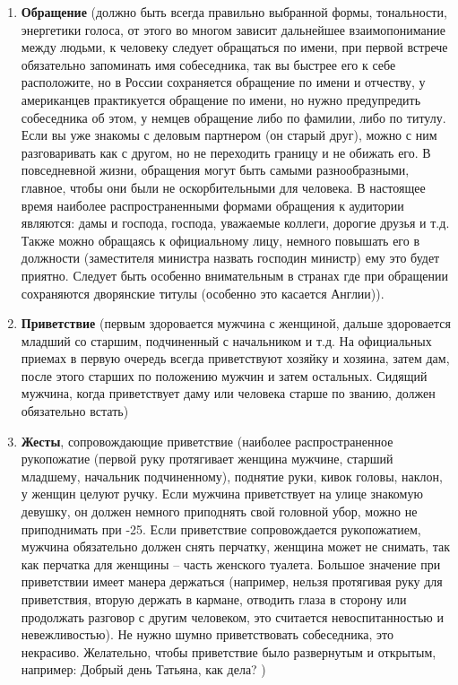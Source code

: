\documentclass{article}
\begin{document}
\begin{enumerate}
    \item \textbf{Обращение} (должно быть всегда правильно выбранной формы, тональности, энергетики голоса, от этого во многом зависит дальнейшее взаимопонимание между людьми, к человеку следует обращаться по имени, при первой встрече обязательно запоминать имя собеседника, так вы быстрее его к себе расположите, но в России сохраняется обращение по имени и отчеству, у американцев практикуется обращение по имени, но нужно предупредить собеседника об этом, у немцев обращение либо по фамилии, либо по титулу. Если вы уже знакомы с деловым партнером (он старый друг), можно с ним разговаривать как с другом, но не переходить границу и не обижать его. В повседневной жизни, обращения могут быть самыми разнообразными, главное, чтобы они были не оскорбительными для человека. В настоящее время наиболее распространенными формами обращения к аудитории являются: дамы и господа, господа, уважаемые коллеги, дорогие друзья и т.д. Также можно обращаясь к официальному лицу, немного повышать его в должности (заместителя министра назвать господин министр) ему это будет приятно. Следует быть особенно внимательным в странах где при обращении сохраняются дворянские титулы (особенно это касается Англии)).
    \item \textbf{Приветствие} (первым здоровается мужчина с женщиной, дальше здоровается младший со старшим, подчиненный с начальником и т.д. На официальных приемах в первую очередь всегда приветствуют хозяйку и хозяина, затем дам, после этого старших по положению мужчин и затем остальных. Сидящий мужчина, когда приветствует даму или человека старше по званию, должен обязательно встать)
    \item \textbf{Жесты}, сопровождающие приветствие (наиболее распространенное рукопожатие (первой руку протягивает женщина мужчине, старший младшему, начальник подчиненному), поднятие руки, кивок головы, наклон, у женщин целуют ручку. Если мужчина приветствует на улице знакомую девушку, он должен немного приподнять свой головной убор, можно не приподнимать при -25. Если приветствие сопровождается рукопожатием, мужчина обязательно должен снять перчатку, женщина может не снимать, так как перчатка для женщины – часть женского туалета. Большое значение при приветствии имеет манера держаться (например, нельзя протягивая руку для приветствия, вторую держать в кармане, отводить глаза в сторону или продолжать разговор с другим человеком, это считается невоспитанностью и невежливостью). Не нужно шумно приветствовать собеседника, это некрасиво. Желательно, чтобы приветствие было развернутым и открытым, например: Добрый день Татьяна, как дела? )

\end{enumerate}
\end{document}
